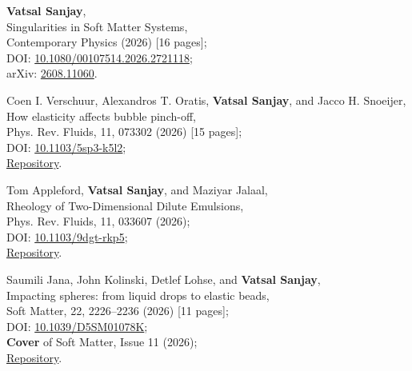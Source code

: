 \documentclass[10pt,a4paper,colorlinks,linkcolor=blue,urlcolor=blue,citecolor=blue]{moderncv}
\begin{document}
\begin{enumerate}[leftmargin=1.5em,label=\textbf{[\arabic*]}]
	\item \textbf{Vatsal Sanjay},\\
	Singularities in Soft Matter Systems,\\
	Contemporary Physics (2026) [16 pages];\\
	\faFile\hspace{0.2em}DOI: \href{https://doi.org/10.1080/00107514.2026.2721118}{10.1080/00107514.2026.2721118};\\
	\faFile\hspace{0.2em}arXiv: \href{https://arxiv.org/abs/2608.11060}{2608.11060}.

	\item Coen I. Verschuur, Alexandros T. Oratis, \textbf{Vatsal Sanjay}, and Jacco H. Snoeijer,\\
	How elasticity affects bubble pinch-off,\\
	Phys. Rev. Fluids, 11, 073302 (2026) [15 pages];\\
	\faFile\hspace{0.2em}DOI: \href{https://doi.org/10.1103/5sp3-k5l2}{10.1103/5sp3-k5l2};\\
	\faGithub\hspace{0.2em}\href{https://github.com/comphy-lab/ElasticPinchOff}{Repository}.

	\item Tom Appleford, \textbf{Vatsal Sanjay}, and Maziyar Jalaal,\\
	Rheology of Two-Dimensional Dilute Emulsions,\\
	Phys. Rev. Fluids, 11, 033607 (2026);\\
	\faFile\hspace{0.2em}DOI: \href{https://doi.org/10.1103/9dgt-rkp5}{10.1103/9dgt-rkp5};\\
	\faGithub\hspace{0.2em}\href{https://github.com/tappleford/droplet_under_shear_newtonian_2D}{Repository}.

	\item Saumili Jana, John Kolinski, Detlef Lohse, and \textbf{Vatsal Sanjay},\\
	Impacting spheres: from liquid drops to elastic beads,\\
	Soft Matter, 22, 2226--2236 (2026) [11 pages];\\
	\faFile\hspace{0.2em}DOI: \href{https://doi.org/10.1039/D5SM01078K}{10.1039/D5SM01078K};\\
	\faStar\hspace{0.2em}\textbf{Cover} of Soft Matter, Issue 11 (2026);\\
	\faGithub\hspace{0.2em}\href{https://github.com/comphy-lab/Soft-Sphere-Impacts}{Repository}.


\end{enumerate}
\end{document}
